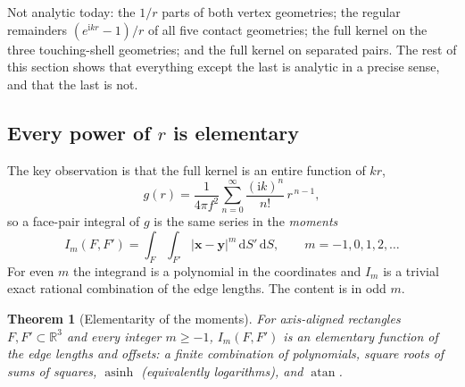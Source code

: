 \documentclass[11pt]{article}
\newtheorem{theorem}{Theorem}[section]
\theoremstyle{remark}
\newcommand{\dd}{\mathrm{d}}
\newcommand{\ii}{\mathrm{i}}
\newcommand{\asinh}{\operatorname{asinh}}
\newcommand{\atan}{\operatorname{atan}}
\newcommand{\Rr}{\mathbb{R}}
\begin{document}
Not analytic today: the $1/r$ parts of both vertex geometries; the regular remainders
$(e^{\ii kr}-1)/r$ of all five contact geometries; the full kernel on the three
touching-shell geometries; and the full kernel on separated pairs. The rest of this
section shows that everything except the last is analytic in a precise sense, and
that the last is not.

\subsection{Every power of $r$ is elementary}
\label{sec:theorem}

The key observation is that the full kernel is an entire function of $kr$,
\begin{equation}
g(r) = \frac{1}{4\pi f^2}\sum_{n=0}^{\infty}\frac{(\ii k)^n}{n!}\,r^{\,n-1},
\label{eq:series}
\end{equation}
so a face-pair integral of $g$ is the same series in the \emph{moments}
\begin{equation}
I_m(F,F') = \int_F\!\int_{F'} |\mathbf{x}-\mathbf{y}|^{m}\,\dd S'\,\dd S,
\qquad m = -1, 0, 1, 2, \ldots
\label{eq:Im}
\end{equation}
For even $m$ the integrand is a polynomial in the coordinates and $I_m$ is a trivial
exact rational combination of the edge lengths. The content is in odd $m$.

\begin{theorem}[Elementarity of the moments]
\label{thm:elem}
For axis-aligned rectangles $F, F'\subset\Rr^3$ and every integer $m\ge -1$,
$I_m(F,F')$ is an elementary function of the edge lengths and offsets: a finite
combination of polynomials, square roots of sums of squares, $\asinh$ (equivalently
logarithms), and $\atan$.
\end{theorem}
\end{document}
